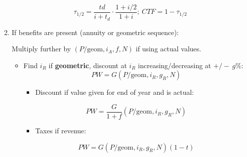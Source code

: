 \begin{process}
\begin{enumerate}
            \begin{equation}
                \tau_{1/2} = \frac{td}{i + t_d} \cdot \frac{1 + i/2}{1+i}; \: CTF = 1 - \tau_{1/2}
            \end{equation}
            \vspace{1em}
        
            \item If benefits are present (annuity or geometric sequence):
            \vspace{1em}

            Multiply further by $(P/\text{geom}, i_A, f, N)$ if using actual values.
            \begin{itemize}
                \item Find \( i_R \) if \textbf{geometric}, discount at \( i_R \) increasing/decreasing at \(+/-\: g\% \):
                \begin{equation}
                    PW = G \left({P/\text{geom}, i_R, g_R, N} \right)
                \end{equation}
                \begin{itemize}
                    \item Discount if value given for end of year and is actual:
                \end{itemize}
                \begin{equation}
                    PW = \frac{G}{1+f} \left(P/\text{geom}, i_R, g_R, N\right)
                \end{equation}
                \begin{itemize}
                    \item Taxes if revenue:
                \end{itemize}
                \begin{equation}
                    PW = G \left(P/\text{geom}, i_R, g_R, N\right) (1-t)
                \end{equation}


\end{itemize}
\end{enumerate}
\end{process}
